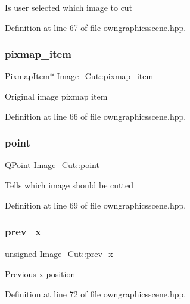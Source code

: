Is user selected which image to cut 

Definition at line 67 of file owngraphicsscene.\+hpp.

\mbox{\label{structImage__Cut_afdafc46c968b35b63758d409ef863a8f}} 
\subsubsection{\texorpdfstring{pixmap\+\_\+item}{pixmap\_item}}
{\footnotesize\ttfamily \mbox{\hyperlink{classPixmapItem}{Pixmap\+Item}}$\ast$ Image\+\_\+\+Cut\+::pixmap\+\_\+item}

Original image pixmap item 

Definition at line 66 of file owngraphicsscene.\+hpp.

\mbox{\label{structImage__Cut_a45fc996285a5ae8ef255d66655d63df2}} 
\subsubsection{\texorpdfstring{point}{point}}
{\footnotesize\ttfamily Q\+Point Image\+\_\+\+Cut\+::point}

Tells which image should be cutted 

Definition at line 69 of file owngraphicsscene.\+hpp.

\mbox{\label{structImage__Cut_a9e6768e7bea9a60876d086d78da3c4df}} 
\subsubsection{\texorpdfstring{prev\+\_\+x}{prev\_x}}
{\footnotesize\ttfamily unsigned Image\+\_\+\+Cut\+::prev\+\_\+x}

Previous x position 

Definition at line 72 of file owngraphicsscene.\+hpp.

\mbox{\label{structImage__Cut_ad86dabb21b97270448d8db5aa7a5676f}} 
